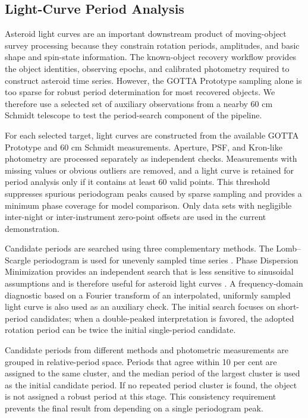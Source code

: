 \documentclass[referee]{raa}
\begin{document}
\subsection{Light-Curve Period Analysis}
\label{sec:method_lightcurve}

Asteroid light curves are an important downstream product of moving-object survey processing because they constrain rotation periods, amplitudes, and basic shape and spin-state information. The known-object recovery workflow provides the object identities, observing epochs, and calibrated photometry required to construct asteroid time series. However, the GOTTA Prototype sampling alone is too sparse for robust period determination for most recovered objects. We therefore use a selected set of auxiliary observations from a nearby 60 cm Schmidt telescope to test the period-search component of the pipeline.

For each selected target, light curves are constructed from the available GOTTA Prototype and 60 cm Schmidt measurements. Aperture, PSF, and Kron-like photometry are processed separately as independent checks. Measurements with missing values or obvious outliers are removed, and a light curve is retained for period analysis only if it contains at least 60 valid points. This threshold suppresses spurious periodogram peaks caused by sparse sampling and provides a minimum phase coverage for model comparison. Only data sets with negligible inter-night or inter-instrument zero-point offsets are used in the current demonstration.

Candidate periods are searched using three complementary methods. The Lomb--Scargle periodogram is used for unevenly sampled time series \citep{Lomb1976,Scargle1982}. Phase Dispersion Minimization provides an independent search that is less sensitive to sinusoidal assumptions and is therefore useful for asteroid light curves \citep{Stellingwerf1978}. A frequency-domain diagnostic based on a Fourier transform of an interpolated, uniformly sampled light curve is also used as an auxiliary check. The initial search focuses on short-period candidates; when a double-peaked interpretation is favored, the adopted rotation period can be twice the initial single-period candidate.

Candidate periods from different methods and photometric measurements are grouped in relative-period space. Periods that agree within 10 per cent are assigned to the same cluster, and the median period of the largest cluster is used as the initial candidate period. If no repeated period cluster is found, the object is not assigned a robust period at this stage. This consistency requirement prevents the final result from depending on a single periodogram peak.
\end{document}
